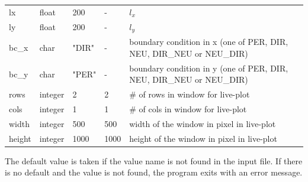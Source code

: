 \documentclass{hitec} %
\begin{document}
\begin{longtable}{llll>{\RaggedRight}p{7cm}}
lx         & float &200    & - & $l_x$  \\
ly         & float &200    & - & $l_y$  \\
bc\_x   & char & "DIR"      & - & boundary condition in x (one of PER, DIR, NEU, DIR\_NEU or NEU\_DIR) \\
bc\_y   & char & "PER"      & - & boundary condition in y (one of PER, DIR, NEU, DIR\_NEU or NEU\_DIR) \\
rows   & integer &  2 & 2 & \# of rows in window for live-plot \\
cols   & integer &  1 & 1 & \# of cols in window for live-plot \\
width  & integer & 500& 500 & width of the window in pixel in live-plot \\
height  & integer & 1000& 1000 & height of the window in pixel in live-plot \\
\bottomrule
\end{longtable}

The default value is taken if the value name is not found in the input file. If there is no default and
the value is not found,
the program exits with an error message.
\end{document}
